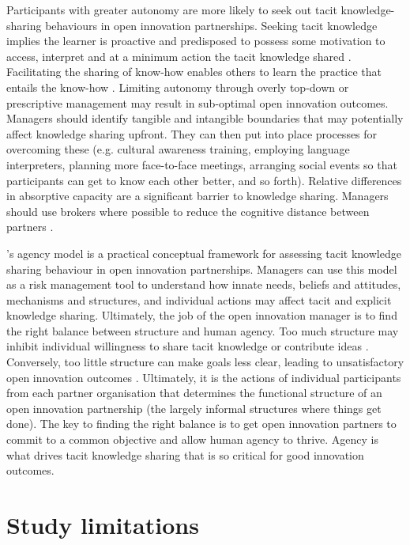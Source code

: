 Participants with greater autonomy are more likely to seek out tacit knowledge-sharing behaviours in open innovation partnerships. Seeking tacit knowledge implies the learner is proactive and predisposed to possess some motivation to access, interpret and at a minimum action the tacit knowledge shared \citep{gubbins2021delineating}. Facilitating the sharing of know-how enables others to learn the practice that entails the know-how \citep{cook1999bridging}. Limiting autonomy through overly top-down or prescriptive management may result in sub-optimal open innovation outcomes. Managers should identify tangible and intangible boundaries that may potentially affect knowledge sharing upfront. They can then put into place processes for overcoming these (e.g. cultural awareness training, employing language interpreters, planning more face-to-face meetings, arranging social events so that participants can get to know each other better, and so forth). Relative differences in absorptive capacity are a significant barrier to knowledge sharing. Managers should use brokers where possible to reduce the cognitive distance between partners \citep{kokshagina2017fast}. \medskip

\citeauthor{loyal2001agency}'s \citeyearpar{loyal2001agency} agency model is a practical conceptual framework for assessing tacit knowledge sharing behaviour in open innovation partnerships. Managers can use this model as a risk management tool to understand how innate needs, beliefs and attitudes, mechanisms and structures, and individual actions may affect tacit and explicit knowledge sharing. Ultimately, the job of the open innovation manager is to find the right balance between structure and human agency. Too much structure may inhibit individual willingness to share tacit knowledge or contribute ideas \citep{al2021understanding}. Conversely, too little structure can make goals less clear, leading to unsatisfactory open innovation outcomes \citep{nunes2020managing}. Ultimately, it is the actions of individual participants from each partner organisation that determines the functional structure of an open innovation partnership (the largely informal structures where things get done). The key to finding the right balance is to get open innovation partners to commit to a common objective and allow human agency to thrive. Agency is what drives tacit knowledge sharing that is so critical for good innovation outcomes.


\section{Study limitations}
 
